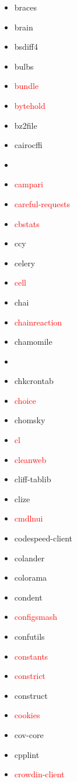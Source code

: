 \documentclass{l4proj}
\begin{document}
\begin{appendices}
{\begin{itemize}
\item braces
\item brain
\item bsdiff4
\item bulbs
\item\textcolor{red}{bundle}
\item\textcolor{red}{bytehold}
\item bz2file
\item cairocffi
\item\textcolor{red}{}
\item\textcolor{red}{campari}
\item\textcolor{red}{careful-requests}
\item\textcolor{red}{cbstats}
\item ccy
\item celery
\item\textcolor{red}{cell}
\end{itemize}
}%
\clearpage
\noindent\parbox[t]{0.32\textwidth}{\raggedright%
\begin{itemize}
\item chai
\item\textcolor{red}{chainreaction}
\item chamomile
\item {}
\item chkcrontab
\item\textcolor{red}{choice}
\item chomsky
\item\textcolor{red}{cl}
\item\textcolor{red}{cleanweb}
\item cliff-tablib
\item clize
\item\textcolor{red}{cmdlnui}
\item codespeed-client
\item colander
\item colorama
\item condent
\item\textcolor{red}{configsmash}
\item confutils
\item\textcolor{red}{constants}
\item\textcolor{red}{constrict}
\item construct
\item\textcolor{red}{cookies}
\item cov-core
\item cpplint
\item\textcolor{red}{crowdin-client}

\end{itemize}}
\end{appendices}
\end{document}
